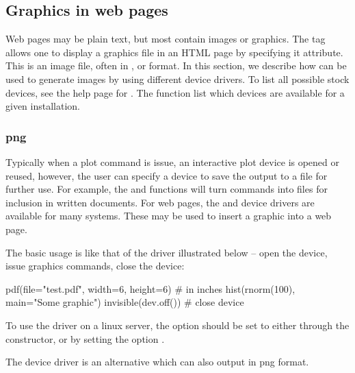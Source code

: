 \subsection{Graphics in web pages}
\label{sec:graphics-web-pages}
Web pages may be plain text, but most contain images or graphics. The
 tag allows one to display a graphics file in an HTML
page by specifying it  attribute. This is an image file,
often in ,  or  format. In this
section, we describe how \R\/ can be used to generate images by using
different device drivers. To list all possible stock devices, see the
help page for . The function  list
which devices are available for a given \R\/ installation.

\subsubsection{png}
\label{sec:images}
Typically when a plot command is issue, an interactive plot device is
opened or reused, however, the user can specify a device to save the
output to a file for further use. For example, the  and
 functions will turn \R\/ commands into files for
inclusion in written documents. For web pages, the  and
 device drivers are available for many systems. These
may be used to insert a graphic into a web page.

The basic usage is like that of the  driver illustrated
below -- open the device, issue graphics commands, close the device:
\begin{Schunk}
\begin{Sinput}
 pdf(file="test.pdf", width=6, height=6) # in inches
 hist(rnorm(100), main="Some graphic")
 invisible(dev.off())                    # close device
\end{Sinput}
\end{Schunk}

To use the  driver on a linux server, the option 
should be set to  either through the constructor, or by
setting the option . 

The  device driver is an alternative which can also output
in png format.



